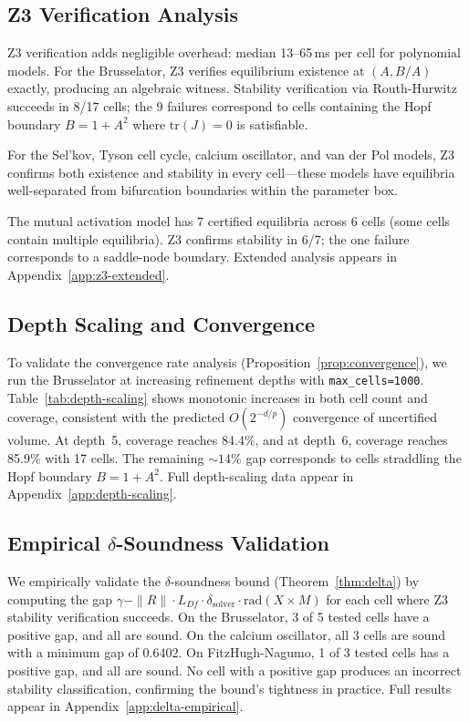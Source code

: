 \documentclass[11pt]{article}
\newcommand{\norm}[1]{\|#1\|}
\begin{document}
\subsection{Z3 Verification Analysis}

Z3 verification adds negligible overhead: median 13--65\,ms per cell for polynomial models.
For the Brusselator, Z3 verifies equilibrium existence at $(A, B/A)$ exactly, producing an algebraic witness.
Stability verification via Routh-Hurwitz succeeds in 8/17 cells; the 9 failures correspond to cells containing the Hopf boundary $B = 1 + A^2$ where $\mathrm{tr}(J) = 0$ is satisfiable.

For the Sel'kov, Tyson cell cycle, calcium oscillator, and van der Pol models, Z3 confirms both existence and stability in every cell---these models have equilibria well-separated from bifurcation boundaries within the parameter box.

The mutual activation model has 7 certified equilibria across 6 cells (some cells contain multiple equilibria).  Z3 confirms stability in 6/7; the one failure corresponds to a saddle-node boundary.  Extended analysis appears in Appendix~\ref{app:z3-extended}.

\subsection{Depth Scaling and Convergence}

To validate the convergence rate analysis (Proposition~\ref{prop:convergence}), we run the Brusselator at increasing refinement depths with \texttt{max\_cells=1000}.
Table~\ref{tab:depth-scaling} shows monotonic increases in both cell count and coverage, consistent with the predicted $O(2^{-d/p})$ convergence of uncertified volume.
At depth~5, coverage reaches 84.4\%, and at depth~6, coverage reaches 85.9\% with 17 cells.
The remaining ${\sim}14\%$ gap corresponds to cells straddling the Hopf boundary $B = 1 + A^2$.
Full depth-scaling data appear in Appendix~\ref{app:depth-scaling}.

\subsection{Empirical $\delta$-Soundness Validation}

We empirically validate the $\delta$-soundness bound (Theorem~\ref{thm:delta}) by computing the gap $\gamma - \norm{R} \cdot L_{Df} \cdot \delta_{\mathrm{solver}} \cdot \mathrm{rad}(X \times M)$ for each cell where Z3 stability verification succeeds.
On the Brusselator, 3 of 5 tested cells have a positive gap, and all are sound.
On the calcium oscillator, all 3 cells are sound with a minimum gap of 0.6402.
On FitzHugh-Nagumo, 1 of 3 tested cells has a positive gap, and all are sound.
No cell with a positive gap produces an incorrect stability classification, confirming the bound's tightness in practice.
Full results appear in Appendix~\ref{app:delta-empirical}.
\end{document}
